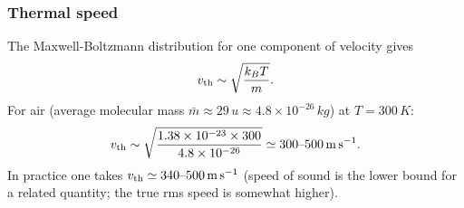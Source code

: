 \subsubsection*{Thermal speed}
The Maxwell-Boltzmann distribution for one component of velocity gives
\begin{equation}
    v_{\rm th} \sim \sqrt{\frac{k_B T}{m}} .
    \label{eq:lec06:thermal-speed}
\end{equation}
For air (average molecular mass $\bar m \approx 29\,\si{u} \approx
4.8\times10^{-26}\,\si{kg}$) at $T = 300\,\si{K}$:
\begin{equation}
    v_{\rm th} \sim \sqrt{\frac{1.38\times10^{-23}\times300}{4.8\times10^{-26}}}
    \simeq 300\text{--}500\,\si{m\,s^{-1}} .
    \label{eq:lec06:vthermal-air}
\end{equation}
In practice one takes $v_{\rm th}\simeq 340\text{--}500\,\si{m\,s^{-1}}$
(speed of sound is the lower bound for a related quantity; the true rms speed
is somewhat higher).

